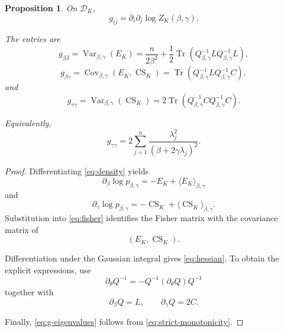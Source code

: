 \documentclass[11pt]{article}
\newtheorem{proposition}[theorem]{Proposition}
\theoremstyle{definition}
\theoremstyle{remark}
\newcommand{\Tr}{\operatorname{Tr}}
\newcommand{\CS}{\operatorname{CS}}
\newcommand{\Var}{\operatorname{Var}}
\newcommand{\Cov}{\operatorname{Cov}}
\begin{document}
\begin{proposition}
\label{prop:fisher}
On \(\mathscr D_K\),
\begin{equation}
g_{ij}
=
\partial_i\partial_j
\log Z_K(\beta,\gamma).
\label{eq:hessian}
\end{equation}

The entries are
\begin{equation}
g_{\beta\beta}
=
\Var_{\beta,\gamma}(E_K)
=
\frac{n}{2\beta^2}
+
\frac12
\Tr\left(
Q_{\beta,\gamma}^{-1}L
Q_{\beta,\gamma}^{-1}L
\right),
\label{eq:gbb}
\end{equation}
\begin{equation}
g_{\beta\gamma}
=
\Cov_{\beta,\gamma}(E_K,\CS_K)
=
\Tr\left(
Q_{\beta,\gamma}^{-1}L
Q_{\beta,\gamma}^{-1}C
\right),
\label{eq:gbg}
\end{equation}
and
\begin{equation}
g_{\gamma\gamma}
=
\Var_{\beta,\gamma}(\CS_K)
=
2\Tr\left(
Q_{\beta,\gamma}^{-1}C
Q_{\beta,\gamma}^{-1}C
\right).
\label{eq:ggg}
\end{equation}

Equivalently,
\begin{equation}
g_{\gamma\gamma}
=
2
\sum_{j=1}^n
\frac{
\lambda_j^2
}{
(\beta+2\gamma\lambda_j)^2
}.
\label{eq:g-eigenvalues}
\end{equation}
\end{proposition}

\begin{proof}
Differentiating \eqref{eq:density} yields
\begin{equation}
\partial_\beta\log p_{\beta,\gamma}
=
-E_K
+
\langle E_K\rangle_{\beta,\gamma}
\end{equation}
and
\begin{equation}
\partial_\gamma\log p_{\beta,\gamma}
=
-\CS_K
+
\langle\CS_K\rangle_{\beta,\gamma}.
\end{equation}
Substitution into \eqref{eq:fisher} identifies the Fisher
matrix with the covariance matrix of
\begin{equation}
(E_K,\CS_K).
\end{equation}

Differentiation under the Gaussian integral gives
\eqref{eq:hessian}. To obtain the explicit expressions, use
\begin{equation}
\partial_\theta Q^{-1}
=
-Q^{-1}
(\partial_\theta Q)
Q^{-1}
\end{equation}
together with
\begin{equation}
\partial_\beta Q=L,
\qquad
\partial_\gamma Q=2C.
\end{equation}

Finally, \eqref{eq:g-eigenvalues} follows from
\eqref{eq:strict-monotonicity}.
\end{proof}
\end{document}
